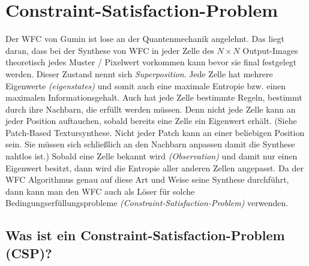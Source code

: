 \documentclass[12pt, a4paper,twoside,openright]{report}
\begin{document}
\section{Constraint-Satisfaction-Problem}

Der WFC von Gumin ist lose an der Quantenmechanik angelehnt.
Das liegt daran, dass bei der Synthese von WFC in jeder Zelle des $N\times N$ Output-Images theoretisch jedes Muster / Pixelwert vorkommen kann bevor sie final festgelegt werden.
Dieser Zustand nennt sich \textit{Superposition}.
Jede Zelle hat mehrere Eigenwerte \textit{(eigenstates)} und somit auch eine maximale Entropie bzw. einen maximalen Informationsgehalt.
Auch hat jede Zelle bestimmte Regeln, bestimmt durch ihre Nachbarn, die erfüllt werden müssen.
Denn nicht jede Zelle kann an jeder Position auftauchen, sobald bereits eine Zelle ein Eigenwert erhält.
{(Siehe Patch-Based Textursynthese. Nicht jeder Patch kann an einer beliebigen Position sein.
Sie müssen sich schließlich an den Nachbarn anpassen damit die Synthese nahtlos ist.)}
Sobald eine Zelle bekannt wird \textit{(Observation)} und damit nur einen Eigenwert besitzt,
dann wird die Entropie aller anderen Zellen angepasst.
 \cite[S.5, 2.2 The wave function]{Zinkernagel_2016}
Da der WFC Algorithmus genau auf diese Art und Weise seine Synthese durchführt,
dann kann man den WFC auch als Löser für solche Bedingungserfüllungsprobleme \textit{(Constraint-Satisfaction-Problem)} verwenden.

\subsection{Was ist ein Constraint-Satisfaction-Problem {(CSP)}?}
\end{document}
